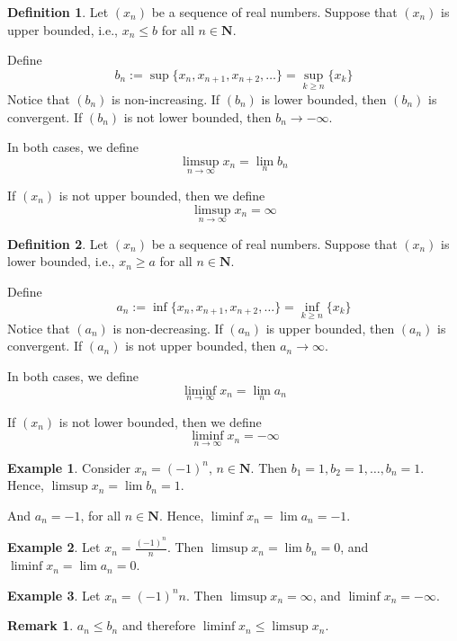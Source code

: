 \documentclass[tikz,12pt,a4paper]{article}
\theoremstyle{definition}
\newtheorem{remark}[theorem]{Remark}
\newtheorem{example}{Example}[section]
\newtheorem{definition}{Definition}[section]
\begin{document}
\begin{definition}
	Let $(x_n)$ be a sequence of real numbers. Suppose that $(x_n)$ is upper bounded, i.e., $x_n \leq b$ for all $n \in \textbf{N}$.
	
	Define
	\[
		b_n := \sup \{ x_n, x_{n+1}, x_{n+2}, \ldots \} = \sup_{k \geq n} \{ x_k \}
	\]
	Notice that $(b_n)$ is non-increasing. If $(b_n)$ is lower bounded, then $(b_n)$ is convergent. If $(b_n)$ is not lower bounded, then $b_n \longrightarrow - \infty$. 
	
	In both cases, we define \[ \limsup_{n \to \infty} x_n = \lim_n b_n \]
	
	If $(x_n)$ is not upper bounded, then we define \[ \limsup_{n \to \infty} x_n = \infty \]
\end{definition}

\begin{definition}
	Let $(x_n)$ be a sequence of real numbers. Suppose that $(x_n)$ is lower bounded, i.e., $x_n \geq a$ for all $n \in \textbf{N}$.
	
	Define
	\[
		a_n := \inf \{ x_n, x_{n+1}, x_{n+2}, \ldots \} = \inf_{k \geq n} \{ x_k \}
	\]
	Notice that $(a_n)$ is non-decreasing. If $(a_n)$ is upper bounded, then $(a_n)$ is convergent. If $(a_n)$ is not upper bounded, then $a_n \longrightarrow \infty$. 
	
	In both cases, we define \[ \liminf_{n \to \infty} x_n = \lim_n a_n \]
	
	If $(x_n)$ is not lower bounded, then we define \[ \liminf_{n \to \infty} x_n = - \infty \]
\end{definition}	

\begin{example}
	Consider $x_n = (-1)^n$, $n \in \textbf{N}$. Then $b_1 = 1, b_2 = 1, \ldots, b_n = 1$. Hence, $\limsup x_n = \lim b_n = 1$.
	
	And $a_n = -1$, for all $n \in \textbf{N}$. Hence, $\liminf x_n = \lim a_n = -1$.
\end{example}

\begin{example}
	Let $x_n = \frac{(-1)^n}{n}$. Then $\limsup x_n = \lim b_n = 0$, and $\liminf x_n = \lim a_n = 0$.
\end{example}

\begin{example}
	Let $x_n = (-1)^n n$. Then $\limsup x_n = \infty$, and $\liminf x_n = - \infty$.
\end{example}

\begin{remark}
	$a_n \leq b_n$ and therefore $\liminf x_n \leq \limsup x_n$.
\end{remark}
\end{document}

